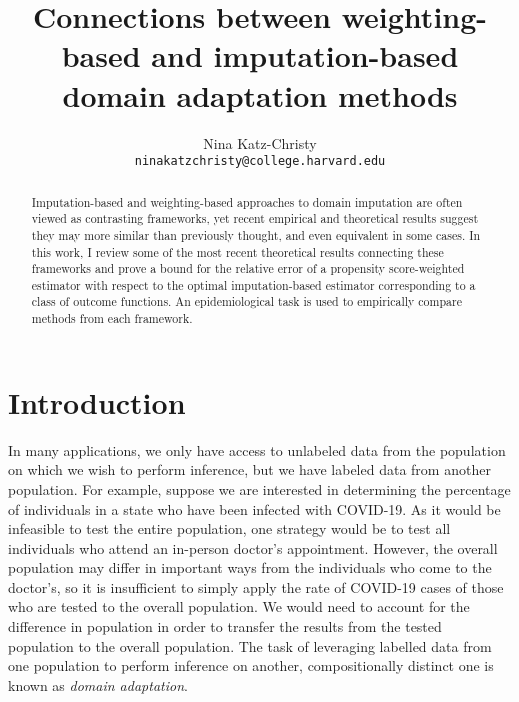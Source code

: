 \documentclass{article} %
\title{Connections between weighting-based and imputation-based domain adaptation methods}
\author{
Nina Katz-Christy\\
\texttt{ninakatzchristy@college.harvard.edu}
}
\begin{document}
\maketitle

\begin{abstract}
Imputation-based and weighting-based approaches to domain imputation are often viewed as contrasting frameworks, yet recent empirical and theoretical results suggest they may more similar than previously thought, and even equivalent in some cases. In this work, I review some of the most recent theoretical results connecting these frameworks and prove a bound for the relative error of a propensity score-weighted estimator with respect to the optimal imputation-based estimator corresponding to a class of outcome functions. An epidemiological task is used to empirically compare methods from each framework.
\end{abstract}



\section{Introduction}

In many applications, we only have access to unlabeled data from the population on which we wish to perform inference, but we have labeled data from another population. For example, suppose we are interested in determining the percentage of individuals in a state who have been infected with COVID-19. As it would be infeasible to test the entire population, one strategy would be to test all individuals who attend an in-person doctor's appointment. However, the overall population may differ in important ways from the individuals who come to the doctor's, so it is insufficient to simply apply the rate of COVID-19 cases of those who are tested to the overall population. We would need to account for the difference in population in order to transfer the results from the tested population to the overall population. The task of leveraging labelled data from one population to perform inference on another, compositionally distinct one is known as \emph{domain adaptation}.
\end{document}
